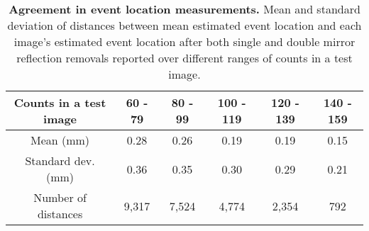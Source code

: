 {\begin{table}[h!]
\centering
\begin{tabular}{|c|ccccc|}
\hline
Counts in a test image & 60 - 79 & 80 - 99 & 100 - 119 & 120 - 139 & 140 - 159 \\
\hline
Mean (mm)                & 0.28 & 0.26 & 0.19 & 0.19 & 0.15 \\
Standard dev.  (mm)      & 0.36 & 0.35 & 0.30 & 0.29 & 0.21  \\
Number of distances    & 9,317  & 7,524  & 4,774  & 2,354  & 792 \\
\hline
\end{tabular}
\caption{\textbf{Agreement in event location measurements.} Mean and standard deviation of distances between mean estimated 
event location and each image's estimated event location after both single and 
double mirror reflection removals reported over different ranges of counts in a 
test image.}
\label{tab:crossval_thresh_error}
\end{table}

}{}


